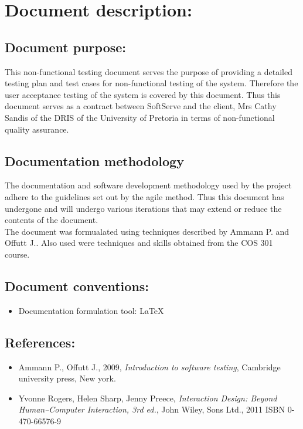 \documentclass[12pt]{article}
\begin{document}
\listoffigures
\newpage
\section{Document description:}

\subsection{Document purpose:}
\vspace{0.2in}
This non-functional testing document serves the purpose of providing a detailed testing plan and test cases for non-functional testing of the system. Therefore the user acceptance testing of the system is covered by this document. Thus this document serves as a contract between SoftServe and the client, Mrs Cathy Sandis of the DRIS of the University of Pretoria in terms of non-functional quality assurance.

\vspace{0.2in}

\subsection{Documentation methodology}
\vspace{0.2in}
\begin{flushleft}
The documentation and software development methodology used by the project adhere to the guidelines set out by the agile method. Thus this document has undergone and will undergo various iterations that may extend or reduce the contents of the document.\\

The document was formualated using techniques described by Ammann P. and Offutt J.. Also used were techniques and skills obtained from the COS 301 course. 

\vspace{0.5in}

\subsection{Document conventions:}
\vspace{0.1in}
\begin{itemize}
\item Documentation formulation tool: LaTeX
\end{itemize}

\vspace{0.2in}
\subsection{References:}
\vspace{0.1in}
\begin{itemize}
\item Ammann P., Offutt J., 2009, \textit{Introduction to software testing}, Cambridge university press, New york.
\item Yvonne Rogers, Helen Sharp,  Jenny Preece,\textit{  Interaction Design: Beyond Human–Computer Interaction, 3rd ed.}, John Wiley, Sons Ltd., 2011 ISBN 0-470-66576-9
\end{itemize}	
\end{flushleft}
\vspace{0.5in}
\end{document}
